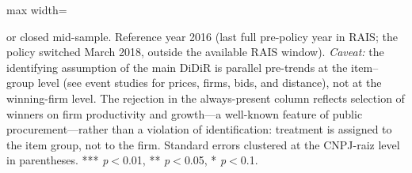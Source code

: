 \begin{table}[htbp]
\begin{adjustbox}{max width=\textwidth}
\begin{threeparttable}
\begin{tablenotes}
or closed mid-sample.
Reference year 2016 (last full pre-policy year in RAIS; the policy switched
March 2018, outside the available RAIS window).
\textit{Caveat:} the identifying assumption of the main DiDiR is parallel
pre-trends at the item--group level (see event studies for prices, firms, bids,
and distance), not at the winning-firm level. The rejection in the
always-present column reflects selection of winners on firm productivity
and growth---a well-known feature of public procurement---rather than a
violation of identification: treatment is assigned to the item group,
not to the firm.
Standard errors clustered at the CNPJ-raiz level in parentheses.
*** \textit{p}$<$0.01, ** \textit{p}$<$0.05, * \textit{p}$<$0.1.
\end{tablenotes}
\end{threeparttable}
\end{adjustbox}
\end{table}
